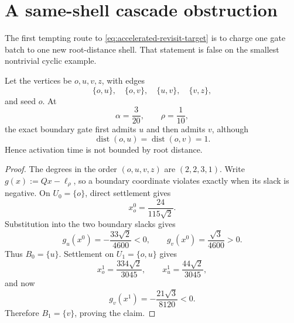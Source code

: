 \section{A same-shell cascade obstruction}
\label{sec:fan-obstruction}

The first tempting route to \cref{eq:accelerated-revisit-target} is to charge
one gate batch to one new root-distance shell.  That statement is false on the
smallest nontrivial cyclic example.

\begin{proposition}
\label{prop:tailed-triangle}
Let the vertices be $o,u,v,z$, with edges
\begin{equation}
 \{o,u\},\quad\{o,v\},\quad\{u,v\},\quad\{v,z\},
 \label{eq:tailed-triangle-edges}
\end{equation}
and seed $o$.  At
\begin{equation}
 \alpha=\frac3{20},
 \qquad
 \rho=\frac1{10},
 \label{eq:tailed-triangle-parameters}
\end{equation}
the exact boundary gate first admits $u$ and then admits $v$, although
\begin{equation}
 \operatorname{dist}(o,u)=\operatorname{dist}(o,v)=1.
 \label{eq:tailed-triangle-same-shell}
\end{equation}
Hence activation time is not bounded by root distance.
\end{proposition}

\begin{proof}
The degrees in the order $(o,u,v,z)$ are $(2,2,3,1)$.  Write
$g(x):=Qx-\ell_\rho$, so a boundary coordinate violates exactly when its
slack is negative.  On $U_0=\{o\}$, direct settlement gives
\begin{equation}
 x_o^0=\frac{24}{115\sqrt2}.
 \label{eq:tailed-triangle-first-value}
\end{equation}
Substitution into the two boundary slacks gives
\begin{equation}
 g_u(x^0)=-\frac{33\sqrt2}{4600}<0,
 \qquad
 g_v(x^0)=\frac{\sqrt3}{4600}>0.
 \label{eq:tailed-triangle-first-slacks}
\end{equation}
Thus $B_0=\{u\}$.  Settlement on $U_1=\{o,u\}$ gives
\begin{equation}
 x_o^1=\frac{334\sqrt2}{3045},
 \qquad
 x_u^1=\frac{44\sqrt2}{3045},
 \label{eq:tailed-triangle-second-values}
\end{equation}
and now
\begin{equation}
 g_v(x^1)=-\frac{21\sqrt3}{8120}<0.
 \label{eq:tailed-triangle-second-slack}
\end{equation}
Therefore $B_1=\{v\}$, proving the claim.
\end{proof}


